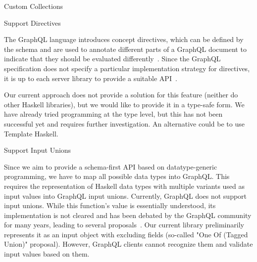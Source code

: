 \begin{frame}
\begin{block}{Custom Collections}
\end{block}

\begin{block}{Support Directives} 

The GraphQL language introduces concept directives, which can be defined by the schema and are used to annotate different parts of a GraphQL document to indicate that they should be evaluated differently~\cite{gql-spec}. Since the GraphQL specification does not specify a particular implementation strategy for directives, it is up to each server library to provide a suitable API~\cite{schema-directives}.

Our current approach does not provide a solution for this feature (neither do other Haskell libraries), but we would like to provide it in a type-safe form. We have already tried programming at the type level, but this has not been successful yet and requires further investigation. An alternative could be to use Template Haskell. 

\end{block}

\begin{block}{Support Input Unions} 

Since we aim to provide a schema-first API based on datatype-generic programming, we have to map all possible data types into GraphQL. This requires the representation of Haskell data types with multiple variants used as input values into GraphQL input unions. Currently, GraphQL does not support input unions. While this function's value is essentially understood, its implementation is not cleared and has been debated by the GraphQL community for many years, leading to several proposals~\cite{gql-spec-input-unions}. Our current library preliminarily represents it as an input object with excluding fields (so-called "One Of (Tagged Union)" proposal). However, GraphQL clients cannot recognize them and validate input values based on them. 

\end{block}

\end{frame}
